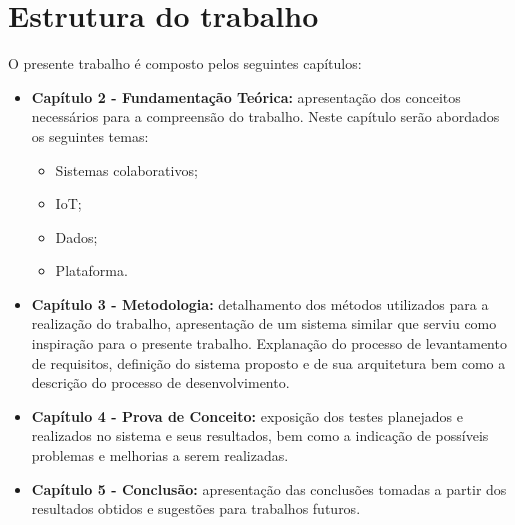 \section{Estrutura do trabalho}
O presente trabalho é composto pelos seguintes capítulos:
\begin{itemize}
  \item \textbf{Capítulo 2 - Fundamentação Teórica:} apresentação dos conceitos necessários para a compreensão do
  trabalho. Neste capítulo serão abordados os seguintes temas:
  \begin{itemize}
    \item Sistemas colaborativos;
    \item \acrlong{IoT};
    \item Dados;
    \item Plataforma.
  \end{itemize}
  \item \textbf{Capítulo 3 - Metodologia:} detalhamento dos métodos utilizados para a realização do trabalho,
  apresentação de um sistema similar que serviu como inspiração para o presente trabalho.
  Explanação do processo de levantamento de requisitos, definição do sistema proposto e de sua arquitetura
  bem como a descrição do processo de desenvolvimento.
  \item \textbf{Capítulo 4 - Prova de Conceito:} exposição dos testes planejados e realizados no sistema e seus resultados, bem como a indicação de possíveis problemas e melhorias a serem realizadas.
  \item \textbf{Capítulo 5 - Conclusão:} apresentação das conclusões tomadas a partir dos resultados obtidos e
  sugestões para trabalhos futuros.
\end{itemize}
